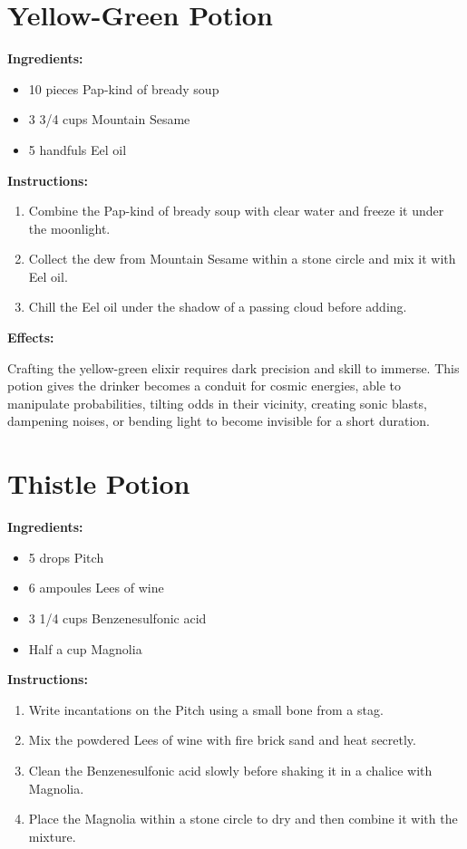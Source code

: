 \documentclass{article}
\begin{document}
\newpage
\section*{Yellow-Green Potion}

\textbf{Ingredients:}

\begin{itemize}
  \item 10 pieces Pap-kind of bready soup
  \item 3 3/4 cups Mountain Sesame
  \item 5 handfuls Eel oil
\end{itemize}

\textbf{Instructions:}

\begin{enumerate}
  \item Combine the Pap-kind of bready soup with clear water and freeze it under the moonlight.
  \item Collect the dew from Mountain Sesame within a stone circle and mix it with Eel oil.
  \item Chill the Eel oil under the shadow of a passing cloud before adding.
\end{enumerate}

\textbf{Effects:}

Crafting the yellow-green elixir requires dark precision and skill to immerse. This potion gives the drinker becomes a conduit for cosmic energies, able to manipulate probabilities, tilting odds in their vicinity, creating sonic blasts, dampening noises, or bending light to become invisible for a short duration.

\newpage
\section*{Thistle Potion}

\textbf{Ingredients:}

\begin{itemize}
  \item 5 drops Pitch
  \item 6 ampoules Lees of wine
  \item 3 1/4 cups Benzenesulfonic acid
  \item Half a cup Magnolia
\end{itemize}

\textbf{Instructions:}

\begin{enumerate}
  \item Write incantations on the Pitch using a small bone from a stag.
  \item Mix the powdered Lees of wine with fire brick sand and heat secretly.
  \item Clean the Benzenesulfonic acid slowly before shaking it in a chalice with Magnolia.
  \item Place the Magnolia within a stone circle to dry and then combine it with the mixture.
\end{enumerate}
\end{document}
